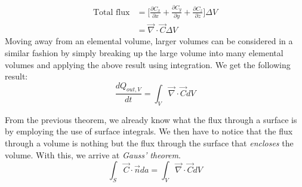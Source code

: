 \begin{align}
	\text{Total flux} &= \Big[ \frac{\partial C_{x}}{\partial x} + \frac{\partial C_{y}}{\partial y} + \frac{\partial C_{z}}{\partial z} \Big] \Delta V\\
	&= \vec{\nabla} \cdot \vec{C} \Delta V
\end{align}
Moving away from an elemental volume, larger volumes can be considered in a similar fashion by simply breaking up the large volume into many elemental volumes and applying the above result using integration. We get the following result: 
\begin{equation}
	\frac{d Q_{out, V}}{dt} = \int_{V} \vec{\nabla} \cdot \vec{C} dV
\end{equation}

From the previous theorem, we already know what the flux through a surface is by employing the use of surface integrals. We then have to notice that the flux through a volume is nothing but the flux through the surface that \emph{encloses} the volume. With this, we arrive at \emph{Gauss' theorem}. 
\begin{equation}
	\int_{S} \vec{C} \cdot \vec{n} da = \int_{V} \vec{\nabla} \cdot \vec{C} dV 
\end{equation}
